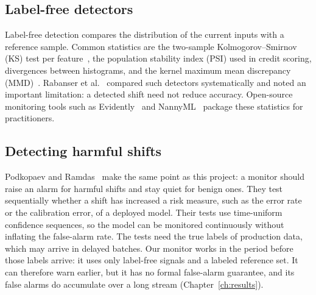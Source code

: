 \subsection{Label-free detectors}
Label-free detection compares the distribution of the current inputs with a reference sample. Common statistics are the two-sample Kolmogorov--Smirnov (KS) test per feature~\cite{massey1951ks}, the population stability index (PSI) used in credit scoring, divergences between histograms, and the kernel maximum mean discrepancy (MMD)~\cite{gretton2012mmd}. Rabanser et al.~\cite{rabanser2019failing} compared such detectors systematically and noted an important limitation: a detected shift need not reduce accuracy. Open-source monitoring tools such as Evidently~\cite{evidently} and NannyML~\cite{nannyml_cbpe} package these statistics for practitioners.

\subsection{Detecting harmful shifts}
Podkopaev and Ramdas~\cite{podkopaev2022tracking} make the same point as this project: a monitor should raise an alarm for harmful shifts and stay quiet for benign ones. They test sequentially whether a shift has increased a risk measure, such as the error rate or the calibration error, of a deployed model. Their tests use time-uniform confidence sequences, so the model can be monitored continuously without inflating the false-alarm rate. The tests need the true labels of production data, which may arrive in delayed batches. Our monitor works in the period before those labels arrive: it uses only label-free signals and a labeled reference set. It can therefore warn earlier, but it has no formal false-alarm guarantee, and its false alarms do accumulate over a long stream (Chapter~\ref{ch:results}).

